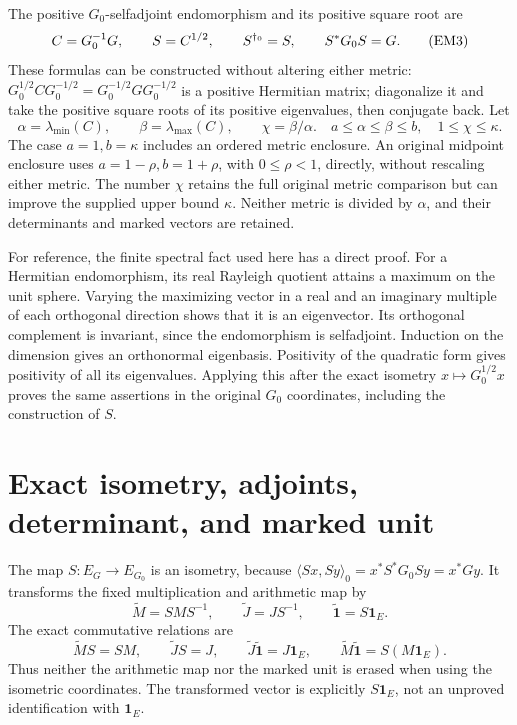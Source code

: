 \documentclass[11pt]{article}
\begin{document}
The positive \(G_0\)-selfadjoint endomorphism and its positive square root are
\begin{equation}
 C=G_0^{-1}G,\qquad S=C^{1/2},\qquad
 S^{\dagger_0}=S,\qquad S^*G_0S=G.
 \tag{EM3}\label{hem:EM3}
\end{equation}
These formulas can be constructed without altering either metric:
\(G_0^{1/2}CG_0^{-1/2}=G_0^{-1/2}GG_0^{-1/2}\) is a positive Hermitian
matrix; diagonalize it and take the positive square roots of its positive
eigenvalues, then conjugate back. Let
\begin{equation}
 \alpha=\lambda_{\min}(C),\qquad\beta=\lambda_{\max}(C),\qquad
 \chi=\beta/\alpha.
 \quad a\le\alpha\le\beta\le b,\quad 1\le\chi\le\kappa.
 \tag{EM4}\label{hem:EM4}
\end{equation}
The case \(a=1,b=\kappa\) includes an ordered metric enclosure.
An original midpoint enclosure uses \(a=1-\rho,b=1+\rho\), with
\(0\le\rho<1\), directly, without rescaling either metric.
The number \(\chi\) retains the full original metric comparison but can
improve the supplied upper bound \(\kappa\). Neither metric is divided
by \(\alpha\), and their determinants and marked vectors are retained.

For reference, the finite spectral fact used here has a direct proof.
For a Hermitian endomorphism, its real Rayleigh quotient attains a maximum
on the unit sphere. Varying the maximizing vector in a real and an imaginary
multiple of each orthogonal direction shows that it is an eigenvector.
Its orthogonal complement is invariant, since the endomorphism is
selfadjoint. Induction on the dimension gives an orthonormal eigenbasis.
Positivity of the quadratic form gives positivity of all its eigenvalues.
Applying this after the exact isometry \(x\mapsto G_0^{1/2}x\) proves the
same assertions in the original \(G_0\) coordinates, including the
construction of \(S\).

\section{Exact isometry, adjoints, determinant, and marked unit}

The map \(S:E_G\to E_{G_0}\) is an isometry, because
\(\langle Sx,Sy\rangle_0=x^*S^*G_0Sy=x^*Gy\).
It transforms the fixed multiplication and arithmetic map by
\begin{equation}
 \widetilde M=SMS^{-1},\qquad
 \widetilde J=JS^{-1},\qquad
 \widetilde{\mathbf1}=S\mathbf1_E.
 \tag{EM5}\label{hem:EM5}
\end{equation}
The exact commutative relations are
\begin{equation}
 \widetilde M S=SM,\qquad
 \widetilde J S=J,\qquad
 \widetilde J\widetilde{\mathbf1}=J\mathbf1_E,\qquad
 \widetilde M\widetilde{\mathbf1}=S(M\mathbf1_E).
 \tag{EM6}\label{hem:EM6}
\end{equation}
Thus neither the arithmetic map nor the marked unit is erased when using
the isometric coordinates. The transformed vector is explicitly
\(S\mathbf1_E\), not an unproved identification with \(\mathbf1_E\).
\end{document}
